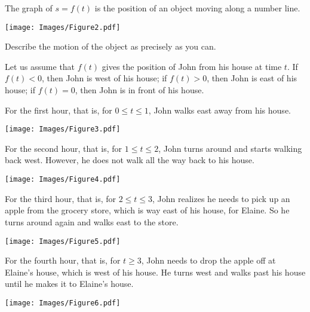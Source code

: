 \documentclass[handout,nooutcomes]{ximera}
\renewenvironment{freeResponse}{
\ifhandout\setbox0\vbox\bgroup\else
\begin{trivlist}\item[\hskip \labelsep\bfseries Solution:\hspace{2ex}]
\fi}
{\ifhandout\egroup\else
\end{trivlist}
\fi}
\begin{document}
\begin{problem}

The graph of $s=f(t)$ is the position of an object moving along a number line.
	\begin{image}
	\texttt{[image: Images/Figure2.pdf]}
	\end{image}
	
	\begin{enumerate}
	
	\item  Describe the motion of the object as precisely as you can.
		\begin{freeResponse}
		Let us assume that $f(t)$ gives the position of John from his house at time $t$.  If $f(t) < 0$, then John is west of his house;  if $f(t) > 0$, then John is east of his house; if $f(t)=0$, then John is in front of his house.  
		
		For the first hour, that is, for $0 \leq t \leq 1$, John walks east away from his house.
		
		\begin{image}
		\texttt{[image: Images/Figure3.pdf]}
		\end{image}
	
		For the second hour, that is, for $1 \leq t \leq 2$, John turns around and starts walking back west.  However, he does not walk all the way back to his house.
		
		\begin{image}
		\texttt{[image: Images/Figure4.pdf]}
		\end{image}
		
		For the third hour, that is, for $2\le t\le 3$, John realizes he needs to pick up an apple from the grocery store, which is way east of his house, for Elaine.  So he turns around again and walks east to the store.
		
		\begin{image}
		\texttt{[image: Images/Figure5.pdf]}
		\end{image}
		
		For the fourth hour, that is, for $t \ge 3$, John needs to drop the apple off at Elaine's house, which is west of his house.  He turns west and walks past his house until he makes it to Elaine's house.
		
		\begin{image}
		\texttt{[image: Images/Figure6.pdf]}
		\end{image}


\end{freeResponse}
\end{enumerate}
\end{problem}
\end{document}
